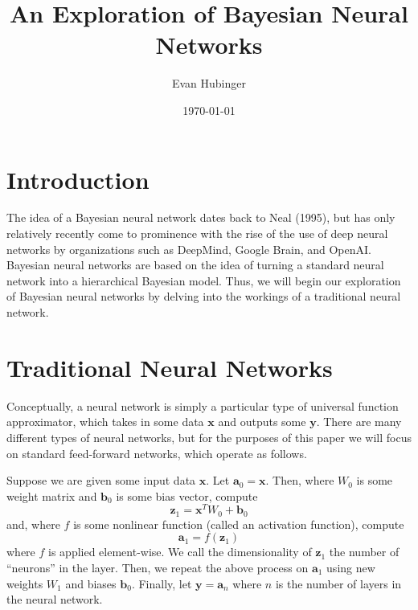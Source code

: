 \documentclass[
    preprint,
    12pt,
    letterpaper,
    longbibliography,
    nofootinbib,
    amsmath,
    amssymb,
    amsfonts,
]{revtex4-1}
\begin{document}
\title{An Exploration of Bayesian Neural Networks}
\author{Evan Hubinger}
\date{\today}

\maketitle




\section{Introduction}

The idea of a Bayesian neural network dates back to Neal (1995)\cite{neal}, but has only relatively recently come to prominence with the rise of the use of deep neural networks by organizations such as DeepMind, Google Brain, and OpenAI. Bayesian neural networks are based on the idea of turning a standard neural network into a hierarchical Bayesian model. Thus, we will begin our exploration of Bayesian neural networks by delving into the workings of a traditional neural network.

\section{Traditional Neural Networks}

Conceptually, a neural network is simply a particular type of universal function approximator, which takes in some data $\bm x$ and outputs some $\bm y$. There are many different types of neural networks, but for the purposes of this paper we will focus on standard feed-forward networks, which operate as follows.

Suppose we are given some input data $\bm x$. Let $\bm a_0 = \bm x$. Then, where $W_0$ is some weight matrix and $\bm b_0$ is some bias vector, compute
\[
    \bm z_1 = \bm x^T W_0 + \bm b_0
\]
and, where $f$ is some nonlinear function (called an activation function), compute
\[
    \bm a_1 = f(\bm z_1)
\]
where $f$ is applied element-wise. We call the dimensionality of $\bm z_1$ the number of ``neurons'' in the layer. Then, we repeat the above process on $\bm a_1$ using new weights $W_1$ and biases $\bm b_0$. Finally, let $\bm y = \bm a_n$ where $n$ is the number of layers in the neural network.
\end{document}
